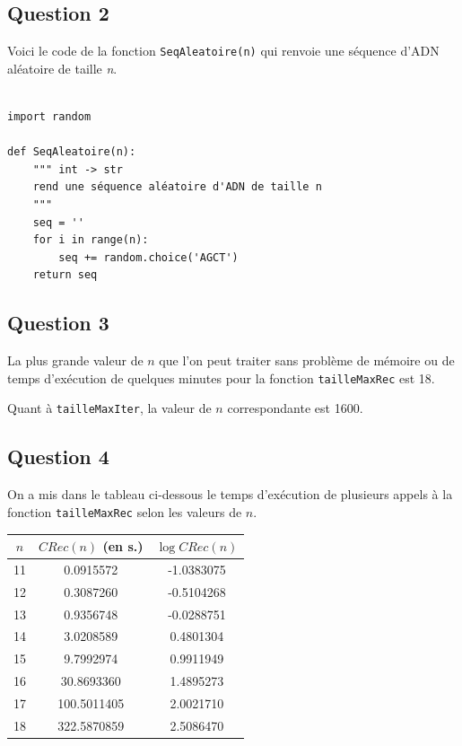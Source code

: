 \documentclass[12pt,a4paper]{article}
\begin{document}
\newpage
\subsection*{Question 2}
Voici le code de la fonction \texttt{SeqAleatoire(n)} qui renvoie une s\'equence d'ADN al\'eatoire de taille {\itshape n}.
\begin{lstlisting}

import random

def SeqAleatoire(n):
    """ int -> str
    rend une séquence aléatoire d'ADN de taille n 
    """
    seq = ''
    for i in range(n):
        seq += random.choice('AGCT')
    return seq
\end{lstlisting}

\subsection*{Question 3}
La plus grande valeur de $n$ que l'on peut traiter sans probl\`eme de m\'emoire ou de temps d'ex\'ecution de quelques minutes pour la fonction \texttt{tailleMaxRec} est 18. 

Quant \`a \texttt{tailleMaxIter}, la valeur de $n$ correspondante est 1600.

\subsection*{Question 4}
On a mis dans le tableau ci-dessous le temps d'ex\'ecution de plusieurs appels \`a la fonction \texttt{tailleMaxRec} selon les valeurs de $n$.
	\begin{center}
	\begin{tabular}{|c|cc|}
	\hline $n$ & $CRec(n)$ (en s.) & $\log CRec(n)$ \\
	\hline 11 &   0.0915572 & -1.0383075 \\ 
	\hline 12 &   0.3087260 & -0.5104268 \\ 
	\hline 13 &   0.9356748 & -0.0288751 \\ 
	\hline 14 &   3.0208589 &  0.4801304 \\
	\hline 15 &   9.7992974 &  0.9911949 \\ 
	\hline 16 &  30.8693360 &  1.4895273 \\ 
	\hline 17 & 100.5011405 &  2.0021710 \\
	\hline 18 & 322.5870859 &  2.5086470 \\
	\hline
	\end{tabular}
	\end{center}
	
\end{document}
